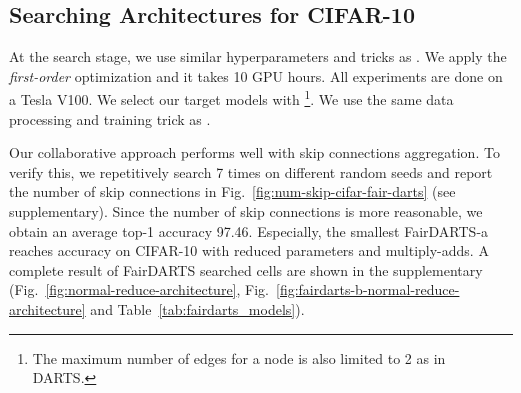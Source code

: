 \documentclass[runningheads]{llncs}
\begin{document}
\subsection{Searching Architectures for CIFAR-10}

At the search stage, we use similar hyperparameters and tricks as \cite{liu2018darts}. We apply the \emph{first-order} optimization and it takes 10 GPU hours. All experiments are done on a Tesla V100.
We select our target models with \footnote{The maximum number of edges for a node is also limited to 2 as in DARTS.}. We use the same data processing and training trick as \cite{liu2018darts,chen2019progressive}. 

Our collaborative approach performs well with skip connections aggregation. To verify this, we repetitively search 7 times on different random seeds and report the number of skip connections in Fig.~\ref{fig:num-skip-cifar-fair-darts} (see supplementary). Since the number of skip connections is more reasonable, we obtain an average top-1 accuracy 97.46. Especially, the smallest FairDARTS-a reaches  accuracy on CIFAR-10 with reduced parameters and multiply-adds. A complete result of FairDARTS searched cells are shown in the supplementary (Fig.~\ref{fig:normal-reduce-architecture}, Fig.~\ref{fig:fairdarts-b-normal-reduce-architecture} and Table~\ref{tab:fairdarts_models}). 
\end{document}
